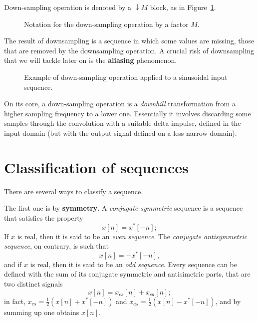 \documentclass[\documentfontsize, twocolumn]{\classname}
\begin{document}
Down-sampling operation is denoted by a $\downarrow M$ block, as in Figure~\ref{tikz:downsamplingOperation}.
\begin{figure}[ht]
\begin{center}
    \caption{Notation for the down-sampling operation by a factor $M$.}\label{tikz:downsamplingOperation}
\end{center}
\end{figure}
The result of downsampling is a se\-quen\-ce in which some values are missing, those that are removed by the downsampling operation. A crucial risk of downsampling that we will tackle later on is the \textbf{aliasing} phenomenon.
\begin{figure*}[ht]
    \centering
    \scalebox{0.6}{
    
    }\caption{Example of down-sampling operation applied to a sinusoidal input se\-quen\-ce.}\label{oct:downsamplingOperationEffect}
\end{figure*}

On its core, a down-sampling operation is a \emph{downhill} transformation from a higher sampling frequency to a lower one. Essentially it involves discarding some samples through the convolution with a suitable delta impulse, defined in the input domain (but with the output signal defined on a less narrow domain).

\section{Classification of se\-quen\-ces}

There are several ways to classify a se\-quen\-ce.

The first one is by \textbf{symmetry}. A \emph{conjugate-symmetric} se\-quen\-ce is a se\-quen\-ce that satisfies the property \[x[n] = x^*[-n];\] If $x$ is real, then it is said to be an \emph{even se\-quen\-ce}. The \emph{conjugate antisymmetric se\-quen\-ce}, on contrary, is such that \[x[n] = -x^*[-n],\] and if $x$ is real, then it is said to be an \emph{odd se\-quen\-ce}. Every se\-quen\-ce can be defined with the sum of its conjugate symmetric and antisimetric parts, that are two distinct signals \[x[n] = x_{cs}[n] + x_{ca}[n];\] in fact, $x_{cs} = \frac{1}{2}(x[n] + x^*[-n])$ and $x_{as} = \frac{1}{2}(x[n] - x^*[-n])$, and by summing up one obtains $x[n]$.
\end{document}
